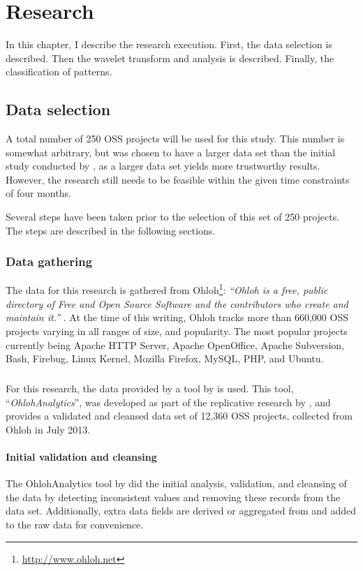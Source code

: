\chapter{Research}
\label{research}

In this chapter, I describe the research execution. First, the data selection is
described. Then the wavelet transform and analysis is described. Finally, the
classification of patterns.

\section{Data selection}
\label{method:data}
A total number of 250 OSS projects will be used for this study. This number is
somewhat arbitrary, but was chosen to have a larger data set than the initial
study conducted by \citet{karus2013}, as a larger data set yields more
trustworthy results. However, the research still needs to be feasible within
the given time constraints of four months.

Several steps have been taken prior to the selection of this set of 250
projects. The steps are described in the following sections.

\subsection{Data gathering}
The data for this research is gathered from
Ohloh\footnote{\url{http://www.ohloh.net}}: \emph{``Ohloh is a free, public
directory of Free and Open Source Software and the contributors who create and
maintain it.'' }\rm \cite{ohloh}. At the time of this writing, Ohloh tracks more
than 660,000 OSS projects varying in all ranges of size, and popularity. The
most popular projects currently being Apache HTTP Server, Apache OpenOffice,
Apache Subversion, Bash, Firebug, Linux Kernel, Mozilla Firefox, MySQL, PHP,
and Ubuntu.

\paragraph{}
For this research, the data provided by a tool by \citet{ohlohanalytics} is
used. This tool, ``\emph{OhlohAnalytics}\rm'', was developed as part of the
replicative research by \citet{bruntink2014}, and provides a validated and
cleansed data set of 12,360 OSS projects, collected from Ohloh in July 2013.

\subsubsection{Initial validation and cleansing}
The OhlohAnalytics tool by \citet{ohlohanalytics} did the initial analysis,
validation, and cleansing of the data by detecting inconsistent values and
removing these records from the data set. Additionally, extra data fields are
derived or aggregated from and added to the raw data for convenience.

